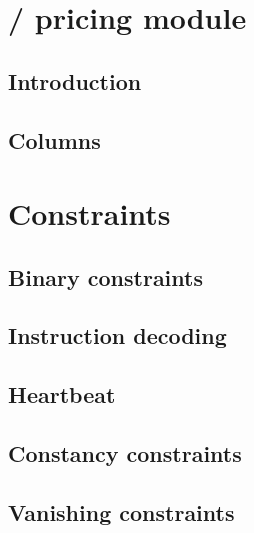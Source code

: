 

\section{ /  pricing module}
\subsection{Introduction}                                                  \label{stp: intro}                        
\subsection{Columns}                                                       \label{stp: columns}                      

\section{Constraints}                                                      \label{stp: constraints}
\subsection{Binary constraints}                                            \label{stp: constraints: binary}          
\subsection{Instruction decoding}                                          \label{stp: constraints: instructions}    
\subsection{Heartbeat}                                                     \label{stp: constraints: heartbeat}       
\subsection{Constancy constraints}                                         \label{stp: constraints: constancy}       
\subsection{Vanishing constraints}                                         \label{stp: constraints: vanishing}       

